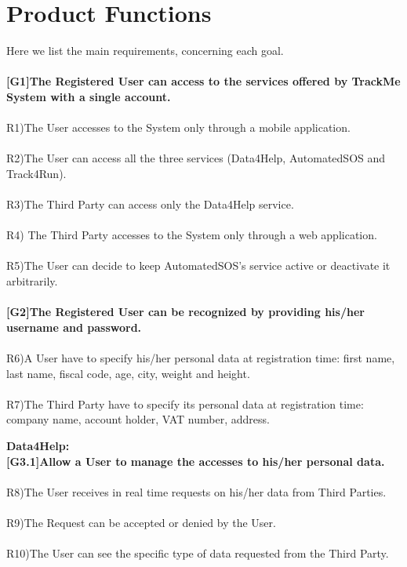 \section{Product Functions}

Here we list the main requirements, concerning each goal. \\ \\

\textbf{[G1]The Registered User can access to the services offered by TrackMe System with a single account. } \\ \\
R1)The User accesses to the System only through a mobile application. \\ \\
R2)The User can access all the three services (Data4Help, AutomatedSOS and Track4Run). \\ \\
R3)The Third Party can access only the Data4Help service. \\ \\
R4) The Third Party accesses to the System only through a web application. \\ \\
R5)The User can decide to keep AutomatedSOS's service active or deactivate it arbitrarily. \\ \\

\textbf{[G2]The Registered User can be recognized by providing his/her username and password.} \\ \\
R6)A User  have to specify his/her personal data at registration time: first name, last name, fiscal code, age, city, weight and height. \\ \\
R7)The Third Party have to specify its personal data at registration time: company name, account holder, VAT number, address. \newline \newline

\textbf{Data4Help:} \\

\textbf{[G3.1]Allow a User to manage the accesses to his/her personal data.} \\ \\
R8)The User receives in real time requests on his/her data from Third Parties. \\ \\
R9)The Request can be accepted or denied by the User.\\ \\
R10)The User can see the specific type of data requested from the Third Party. \\ \\ 

